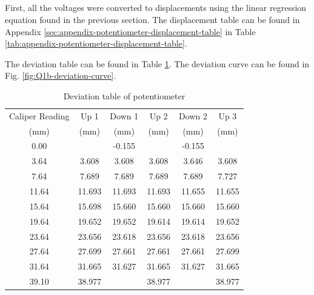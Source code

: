 \subsection{}

First, all the voltages were converted to displacements using the linear regression equation found in the previous section. The
displacement table can be found in Appendix \ref{sec:appendix-potentiometer-displacement-table} in Table \ref{tab:appendix-potentiometer-displacement-table}.

The deviation table can be found in Table \ref{tab:Q1b-deviation-table}. The deviation curve can be found in Fig. \ref{fig:Q1b-deviation-curve}.


\begin{table}[h]
    \centering
    \caption{Deviation table of potentiometer}
    \label{tab:Q1b-deviation-table}
    \begin{tabular}{cccccc}
        \hline
        Caliper Reading & Up 1 & Down 1 & Up 2 & Down 2 & Up 3 \\
        (mm) & (mm) & (mm) & (mm) & (mm) & (mm) \\
        \midrule
        0.00 & & -0.155 & & -0.155 & \\
        3.64 & 3.608 & 3.608 & 3.608 & 3.646 & 3.608 \\
        7.64 & 7.689 & 7.689 & 7.689 & 7.689 & 7.727 \\
        11.64 & 11.693 & 11.693 & 11.693 & 11.655 & 11.655 \\
        15.64 & 15.698 & 15.660 & 15.660 & 15.660 & 15.660 \\
        19.64 & 19.652 & 19.652 & 19.614 & 19.614 & 19.652 \\
        23.64 & 23.656 & 23.618 & 23.656 & 23.618 & 23.656 \\
        27.64 & 27.699 & 27.661 & 27.661 & 27.661 & 27.699 \\
        31.64 & 31.665 & 31.627 & 31.665 & 31.627 & 31.665 \\
        39.10 & 38.977 & & 38.977 & & 38.977 \\
        \hline
    \end{tabular}
\end{table}

